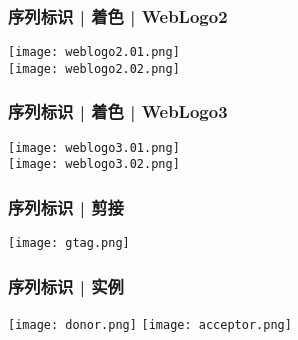 \begin{frame}
  \frametitle{序列标识 | 着色 | WebLogo2}
  \begin{center}
    \texttt{[image: weblogo2.01.png]}\\
    \vspace{1em}
    \texttt{[image: weblogo2.02.png]}
  \end{center}
\end{frame}

\begin{frame}
  \frametitle{序列标识 | 着色 | WebLogo3}
  \begin{center}
    \texttt{[image: weblogo3.01.png]}\\
    \vspace{1em}
    \texttt{[image: weblogo3.02.png]}
  \end{center}
\end{frame}

\begin{frame}
  \frametitle{序列标识 | 剪接}
  \begin{center}
    \texttt{[image: gtag.png]}
  \end{center}
\end{frame}

\begin{frame}
  \frametitle{序列标识 | 实例}
  \begin{center}
    \texttt{[image: donor.png]}
    \vspace{0.5cm}
    \texttt{[image: acceptor.png]}
  \end{center}
\end{frame}

